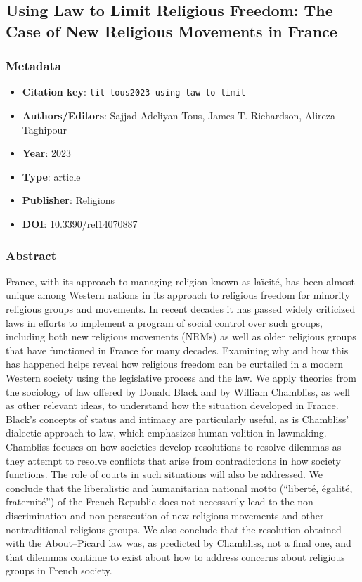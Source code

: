\subsection{Using Law to Limit Religious Freedom: The Case of New Religious Movements in France}\label{lit:lit-tous2023-using-law-to-limit}
\subsubsection*{Metadata}
\begin{itemize}
  \item \textbf{Citation key}: \texttt{lit-tous2023-using-law-to-limit}
  \item \textbf{Authors/Editors}: Sajjad Adeliyan Tous, James T. Richardson, Alireza Taghipour
  \item \textbf{Year}: 2023
  \item \textbf{Type}: article
  \item \textbf{Publisher}: Religions
  \item \textbf{DOI}: 10.3390/rel14070887
\end{itemize}
\subsubsection*{Abstract}
France, with its approach to managing religion known as laïcité, has been almost unique among Western nations in its approach to religious freedom for minority religious groups and movements. In recent decades it has passed widely criticized laws in efforts to implement a program of social control over such groups, including both new religious movements (NRMs) as well as older religious groups that have functioned in France for many decades. Examining why and how this has happened helps reveal how religious freedom can be curtailed in a modern Western society using the legislative process and the law. We apply theories from the sociology of law offered by Donald Black and by William Chambliss, as well as other relevant ideas, to understand how the situation developed in France. Black’s concepts of status and intimacy are particularly useful, as is Chambliss’ dialectic approach to law, which emphasizes human volition in lawmaking. Chambliss focuses on how societies develop resolutions to resolve dilemmas as they attempt to resolve conflicts that arise from contradictions in how society functions. The role of courts in such situations will also be addressed. We conclude that the liberalistic and humanitarian national motto (“liberté, égalité, fraternité”) of the French Republic does not necessarily lead to the non-discrimination and non-persecution of new religious movements and other nontraditional religious groups. We also conclude that the resolution obtained with the About–Picard law was, as predicted by Chambliss, not a final one, and that dilemmas continue to exist about how to address concerns about religious groups in French society.

